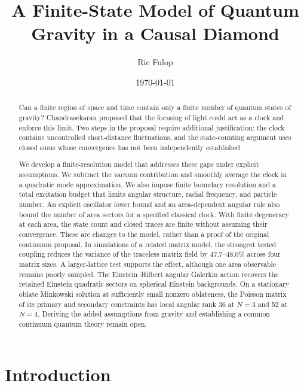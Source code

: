 \documentclass[onecolumn,11pt,aps,prd,amsmath,amssymb,nofootinbib,floatfix]{revtex4-2}
\begin{document}
\title{A Finite-State Model of Quantum Gravity in a Causal Diamond}

\author{Ric Fulop}
\date{\today}

\begin{abstract}
Can a finite region of space and time contain only a finite number of quantum states of gravity? Chandrasekaran proposed that the focusing of light could act as a clock and enforce this limit. Two steps in the proposal require additional justification: the clock contains uncontrolled short-distance fluctuations, and the state-counting argument uses closed sums whose convergence has not been independently established.

We develop a finite-resolution model that addresses these gaps under explicit assumptions. We subtract the vacuum contribution and smoothly average the clock in a quadratic mode approximation. We also impose finite boundary resolution and a total excitation budget that limits angular structure, radial frequency, and particle number. An explicit oscillator lower bound and an area-dependent angular rule also bound the number of area sectors for a specified classical clock. With finite degeneracy at each area, the state count and closed traces are finite without assuming their convergence. These are changes to the model, rather than a proof of the original continuum proposal. In simulations of a related matrix model, the strongest tested coupling reduces the variance of the traceless matrix field by 47.7--48.0\% across four matrix sizes. A larger-lattice test supports the effect, although one area observable remains poorly sampled. The Einstein--Hilbert angular Galerkin action recovers the retained Einstein quadratic sectors on spherical Einstein backgrounds. On a stationary oblate Minkowski solution at sufficiently small nonzero oblateness, the Poisson matrix of its primary and secondary constraints has local angular rank 36 at $N=3$ and 52 at $N=4$. Deriving the added assumptions from gravity and establishing a common continuum quantum theory remain open.
\end{abstract}

\maketitle

\section{Introduction}\label{sec:intro}
\end{document}
